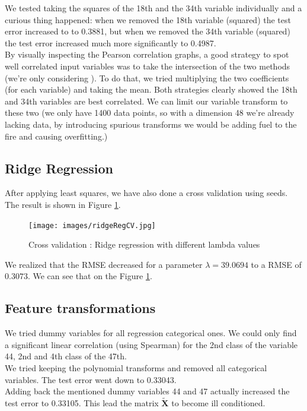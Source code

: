 \documentclass{article} %
\begin{document}
We tested taking the squares of the 18th and the 34th variable individually and a curious thing happened: when we removed the 18th variable (squared) the test error increased to to 0.3881, but when we removed the 34th variable (squared) the test error increased much more significantly to 0.4987.\\

\label{sec:regridgreg}
By visually inspecting the Pearson correlation graphs, a good strategy to spot well correlated input variables was to take the intersection of the two methods (we’re only considering ). To do that, we tried multiplying the two coefficients (for each variable) and taking the mean. Both strategies clearly showed the 18th and 34th variables are best correlated. We can limit our variable transform to these two (we only have 1400 data points, so with a dimension 48 we’re already lacking data, by introducing spurious transforms we would be adding fuel to the fire and causing overfitting.)

\subsection{Ridge Regression}
After applying least squares, we have also done a cross validation using seeds. The result is shown in Figure \ref{fig:ridreggcv}.
\begin{figure}
\centering
\texttt{[image: images/ridgeRegCV.jpg]}
\caption{Cross validation : Ridge regression with different lambda values }
\label{fig:ridreggcv}
\end{figure}
We realized that the RMSE decreased for a parameter $\lambda = 39.0694$ to a RMSE of $0.3073$. We can see that on the Figure \ref{fig:ridreggcv}.

\subsection{Feature transformations}
We tried dummy variables for all regression categorical ones. We could only find a significant linear correlation (using Spearman) for the 2nd class of the variable 44, 2nd and 4th class of the 47th.\\

We tried keeping the polynomial transforms and removed all categorical variables. The test error went down to 0.33043.\\

Adding back the mentioned dummy variables 44 and 47 actually increased the test error to 0.33105. This lead the matrix $\mathbf{\tilde{X}}$ to become ill conditioned.\\
\end{document}
